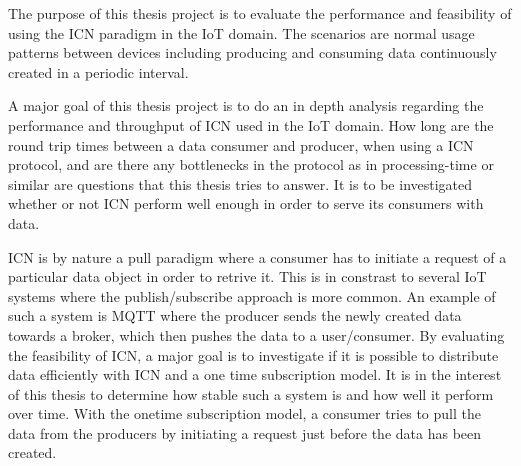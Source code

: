 The purpose of this thesis project is to evaluate the performance and feasibility of using the ICN paradigm in the IoT domain. The scenarios are normal usage patterns between devices including producing and consuming data continuously created in a periodic interval. 

A major goal of this thesis project is to do an in depth analysis regarding the performance and throughput of ICN used in the IoT domain. How long are the round trip times between a data consumer and producer, when using a ICN protocol, and are there any bottlenecks in the protocol as in processing-time or similar are questions that this thesis tries to answer. It is to be investigated whether or not ICN perform well enough in order to serve its consumers with data.

ICN is by nature a pull paradigm where a consumer has to initiate a request of a particular data object in order to retrive it. This is in constrast to several IoT systems where the publish/subscribe approach is more common. An example of such a system is MQTT \cite{mqtt} where the producer sends the newly created data towards a broker, which then pushes the data to a user/consumer. %
By evaluating the feasibility of ICN, a major goal is to investigate if it is possible to distribute data efficiently with ICN and a one time subscription model. It is in the interest of this thesis to determine how stable such a system is and how well it perform over time. With the onetime subscription model, a consumer tries to pull the data from the producers by initiating a request just before the data has been created. 



